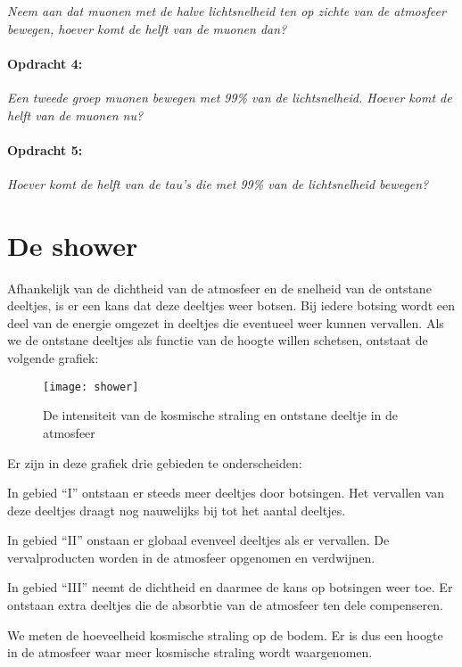 \emph{Neem aan dat muonen met de halve lichtsnelheid ten op zichte
van de atmosfeer bewegen, hoever komt de helft van de muonen dan?}


\paragraph*{Opdracht 4:}

\emph{Een tweede groep muonen bewegen met 99\% van de lichtsnelheid.
Hoever komt de helft van de muonen nu?}


\paragraph*{Opdracht 5:}

\emph{Hoever komt de helft van de tau's die met 99\% van de lichtsnelheid
bewegen?}


\section{De shower}

Afhankelijk van de dichtheid van de atmosfeer en de snelheid van de
ontstane deeltjes, is er een kans dat deze deeltjes weer botsen. Bij
iedere botsing wordt een deel van de energie omgezet in deeltjes die
eventueel weer kunnen vervallen. Als we de ontstane deeltjes als functie
van de hoogte willen schetsen, ontstaat de volgende grafiek:

\begin{figure}[H]
\noindent \begin{centering}
\texttt{[image: shower]}
\par\end{centering}

\caption{De intensiteit van de kosmische straling en ontstane deeltje in de
atmosfeer}
\end{figure}


Er zijn in deze grafiek drie gebieden te onderscheiden:

In gebied ``I'' ontstaan er steeds meer deeltjes door botsingen.
Het vervallen van deze deeltjes draagt nog nauwelijks bij tot het
aantal deeltjes.

In gebied ``II'' onstaan er globaal evenveel deeltjes als er vervallen.
De vervalproducten worden in de atmosfeer opgenomen en verdwijnen.

In gebied ``III'' neemt de dichtheid en daarmee de kans op botsingen
weer toe. Er ontstaan extra deeltjes die de absorbtie van de atmosfeer
ten dele compenseren.

We meten de hoeveelheid kosmische straling op de bodem. Er is dus
een hoogte in de atmosfeer waar meer kosmische straling wordt waargenomen.


